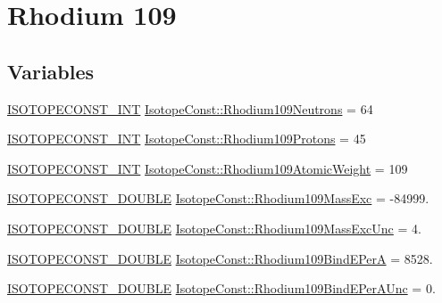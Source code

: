 \hypertarget{group___isotope_const-_rhodium-_rh109}{}\section{Rhodium 109}
\label{group___isotope_const-_rhodium-_rh109}
\subsection*{Variables}
\begin{DoxyCompactItemize}
\item 
\mbox{\hyperlink{group___isotope_const-_macros_ga5f18360b3e99483a35c32d789e62621c}{I\+S\+O\+T\+O\+P\+E\+C\+O\+N\+S\+T\+\_\+\+I\+NT}} \mbox{\hyperlink{group___isotope_const-_rhodium-_rh109_ga8376f251387339ef41d68dfb3d6b2e37}{Isotope\+Const\+::\+Rhodium109\+Neutrons}} = 64
\item 
\mbox{\hyperlink{group___isotope_const-_macros_ga5f18360b3e99483a35c32d789e62621c}{I\+S\+O\+T\+O\+P\+E\+C\+O\+N\+S\+T\+\_\+\+I\+NT}} \mbox{\hyperlink{group___isotope_const-_rhodium-_rh109_gabfd6b57cb7e7fb5288f8ab7686c9ae85}{Isotope\+Const\+::\+Rhodium109\+Protons}} = 45
\item 
\mbox{\hyperlink{group___isotope_const-_macros_ga5f18360b3e99483a35c32d789e62621c}{I\+S\+O\+T\+O\+P\+E\+C\+O\+N\+S\+T\+\_\+\+I\+NT}} \mbox{\hyperlink{group___isotope_const-_rhodium-_rh109_ga7203d92ac018bbbecd10bbc98426f140}{Isotope\+Const\+::\+Rhodium109\+Atomic\+Weight}} = 109
\item 
\mbox{\hyperlink{group___isotope_const-_macros_ga8f45a7272ce02c0b4c65c44636ed719a}{I\+S\+O\+T\+O\+P\+E\+C\+O\+N\+S\+T\+\_\+\+D\+O\+U\+B\+LE}} \mbox{\hyperlink{group___isotope_const-_rhodium-_rh109_ga9cf036c81fd0782e089faf2926787de5}{Isotope\+Const\+::\+Rhodium109\+Mass\+Exc}} = -\/84999.
\item 
\mbox{\hyperlink{group___isotope_const-_macros_ga8f45a7272ce02c0b4c65c44636ed719a}{I\+S\+O\+T\+O\+P\+E\+C\+O\+N\+S\+T\+\_\+\+D\+O\+U\+B\+LE}} \mbox{\hyperlink{group___isotope_const-_rhodium-_rh109_ga7ae01bda2aa3d79cd370364b954b3e9a}{Isotope\+Const\+::\+Rhodium109\+Mass\+Exc\+Unc}} = 4.
\item 
\mbox{\hyperlink{group___isotope_const-_macros_ga8f45a7272ce02c0b4c65c44636ed719a}{I\+S\+O\+T\+O\+P\+E\+C\+O\+N\+S\+T\+\_\+\+D\+O\+U\+B\+LE}} \mbox{\hyperlink{group___isotope_const-_rhodium-_rh109_ga457e055efc22634bbfb6f02d2c930279}{Isotope\+Const\+::\+Rhodium109\+Bind\+E\+PerA}} = 8528.
\item 
\mbox{\hyperlink{group___isotope_const-_macros_ga8f45a7272ce02c0b4c65c44636ed719a}{I\+S\+O\+T\+O\+P\+E\+C\+O\+N\+S\+T\+\_\+\+D\+O\+U\+B\+LE}} \mbox{\hyperlink{group___isotope_const-_rhodium-_rh109_ga195e71c9b6154da551be62f251e8465b}{Isotope\+Const\+::\+Rhodium109\+Bind\+E\+Per\+A\+Unc}} = 0.

\end{DoxyCompactItemize}
